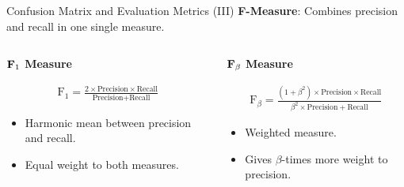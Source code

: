 \begin{frame}{Confusion Matrix and Evaluation Metrics (III)}
	\textbf{F-Measure}: Combines precision and recall in one single measure.

	\begin{columns}
		\begin{column}{0.5\textwidth}
			\begin{center}
				\textbf{$\text{\textbf{F}}_1$ Measure}
			\end{center}
			\begin{align*}
				\text{F}_1 = \frac{2 \times \text{Precision} \times \text{Recall}}{\text{Precision} + \text{Recall}}
			\end{align*}

			\begin{itemize}
				\item Harmonic mean between precision and recall.
				\item Equal weight to both measures.
			\end{itemize}
		\end{column}

		\begin{column}{0.5\textwidth}
			\begin{center}
				\textbf{$\text{\textbf{F}}_\beta$ Measure}
			\end{center}
			\vspace*{-.5em}
			\begin{align*}
				\text{F}_\beta = \frac{(1 + \beta^2) \times \text{Precision} \times \text{Recall}}{\beta^2 \times \text{Precision} + \text{Recall}}
			\end{align*}

			\begin{itemize}
				\item Weighted measure.
				\item Gives $\beta$-times more weight to precision.
			\end{itemize}
		\end{column}
	\end{columns}
\end{frame}

